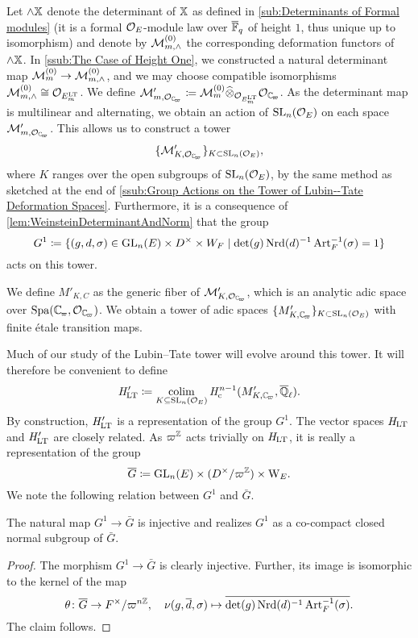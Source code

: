 \documentclass[../main.tex]{subfiles}
\begin{document}
Let $\wedge \mathbb{X}$ denote the determinant of $\mathbb{X}$ as defined in 
\cref{sub:Determinants of Formal modules} (it is a formal $\mathcal{O}_E$-module law over
${\overline {\mathbb{F}}_q}$ of height $1$, thus unique up to isomorphism) 
and denote by $\mathcal{M}_{m, \wedge}^{(0)}$ the corresponding deformation functors of
$\wedge \mathbb{X}$. 
In \cref{ssub:The Case of Height One}, we constructed a natural
determinant map $\mathcal{M}_{m}^{(0)} \to \mathcal{M}_{m ,\wedge}^{(0)}$, and we may choose compatible
isomorphisms $\mathcal{M}_{m, \wedge}^{(0)} \cong \mathcal{O}_{E^{\mathrm{LT}}_m}$. 
We define $\cM'_{m,\cO_\Cp} \coloneq \cM_{m}^{(0)} \cotimes_{\cO_{E^\LT_m}} \cO_\Cp$.
As the determinant map is multilinear and alternating, we obtain an action of 
$\operatorname{SL}_n(\mathcal{O}_E)$ on each space $\cM'_{m,\cO_\Cp}$. This allows us to construct a tower
$$\{\cM'_{K, \cO_\Cp}\}_{K \subset \SL_n(\cO_E)},$$ where $K$ ranges over the 
open subgroups of $\operatorname{SL}_n(\mathcal{O}_E)$, by the same method as sketched
at the end of \cref{ssub:Group Actions on the Tower of Lubin--Tate Deformation
Spaces}. Furthermore, it is a consequence of \cref{lem:WeinsteinDeterminantAndNorm}
that the group 
\begin{equation}\label{eq:DefGandG1}
  G^1 \coloneqq \{(g,d,\sigma) \in \operatorname{GL}_n(E) \times D^\times \times W_F \mid 
  \det(g) \operatorname{Nrd}(d)^{-1} \operatorname{Art}_F^{-1}(\sigma) = 1\}
\end{equation}
acts on this tower.

We define $M'_{K, C}$ as the generic fiber of $\cM'_{K, \cO_\Cp}$, which is 
an analytic adic space over $\spa(\Cp,\allowbreak \cO_\Cp)$. We obtain a tower
of adic spaces
$\{M'_{K, \Cp}\}_{K \subset \SL_n(\cO_E)}$ with finite \'etale transition maps. 

Much of our study of the Lubin--Tate tower will evolve around
this tower. It will therefore be convenient to define 
\begin{equation*}
  \HLT' \coloneqq \colim_{K \subseteq \SL_n(\cO_E)} \hHc^{n-1}(M_{K,\Cp}', \Qlbar).
\end{equation*}
By construction, $\mathit H_{\mathrm{LT}}'$ is a representation of the group $G^1$. 
The vector spaces $\mathit H_{\mathrm{LT}}$ and $\mathit H_{\mathrm{LT}}'$ are closely related. 
As $\varpi^{\mathbb{Z}}$ acts trivially on $\mathit H_{\mathrm{LT}}$, it is really a representation of the group
\begin{equation*}
  \overline G \coloneqq \operatorname{GL}_n(E) \times (D^\times/\varpi^{\mathbb{Z}}) \times \mathrm W_E.
\end{equation*}
We note the following relation between $G^1$ and $\bar G$.
\begin{lem}\label{lem:G1subG}
  The natural map $G^1 \to \bar G$ is injective and realizes $G^1$ as a co-compact closed
  normal subgroup of $\bar G$.
\begin{proof}
  The morphism $G^1 \to \bar G$ is clearly injective. Further, its image is
  isomorphic to the kernel of the map 
  \begin{equation*}
   \theta \colon \overline G \to F^\times/\varpi^{n\mathbb{Z}}, \quad \nu(g, \overline d, \sigma) \mapsto 
 \overline{\det(g)\operatorname{Nrd}(d)^{-1}\operatorname{Art}_F^{-1}(\sigma)}.
  \end{equation*}
  The claim follows.
\end{proof}
\end{lem}
\end{document}
